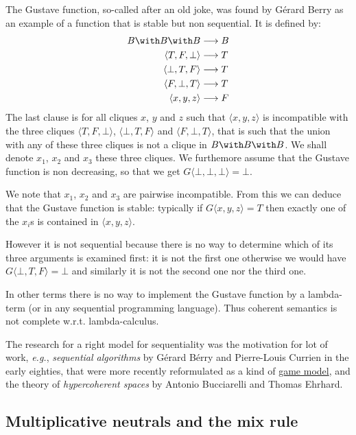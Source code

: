 The Gustave function, so-called after an old joke, was found by Gérard
Berry as an example of a function that is stable but non sequential. It
is defined by:
\begin{align*}
  B\with B\with B           & \longrightarrow B\\
  \langle T, F, \bot\rangle & \longrightarrow T\\
  \langle \bot, T, F\rangle & \longrightarrow T\\
  \langle F, \bot, T\rangle & \longrightarrow T\\
  \langle x, y, z\rangle    & \longrightarrow F
\end{align*}
The last clause is for all cliques \(x\), \(y\) and \(z\) such that
\(\langle x, y ,z\rangle\) is incompatible with the three cliques
\(\langle T, F, \bot\rangle\), \(\langle \bot, T, F\rangle\) and
\(\langle F, \bot, T\rangle\), that is such that the union with any of
these three cliques is not a clique in \(B\with B\with B\). We shall
denote \(x_1\), \(x_2\) and \(x_3\) these three cliques.
We furthemore assume that the Gustave function is non decreasing, so
that we get \(G\langle\bot,\bot,\bot\rangle = \bot\).

We note that \(x_1\), \(x_2\) and \(x_3\) are pairwise incompatible.
From this we can deduce that the Gustave function is stable: typically
if \(G\langle x,y,z\rangle = T\) then exactly one of the \(x_i\)s is
contained in \(\langle x, y, z\rangle\).

However it is not sequential because there is no way to determine which
of its three arguments is examined first: it is not the first one
otherwise we would have \(G\langle\bot, T, F\rangle = \bot\) and
similarly it is not the second one nor the third one.

In other terms there is no way to implement the Gustave function by a
lambda-term (or in any sequential programming language). Thus coherent
semantics is not complete w.r.t. lambda-calculus.

The research for a right model for sequentiality was the motivation for
lot of work, \emph{e.g.}, \emph{sequential algorithms} by Gérard Bérry
and Pierre-Louis Currien in the early eighties, that were more recently
reformulated as a kind of \hyperref[game-semantics]{game model}, and the
theory of \emph{hypercoherent spaces} by Antonio Bucciarelli and Thomas
Ehrhard.

\subsection{Multiplicative neutrals and the mix rule}\label{multiplicative-neutrals-and-the-mix-rule}

